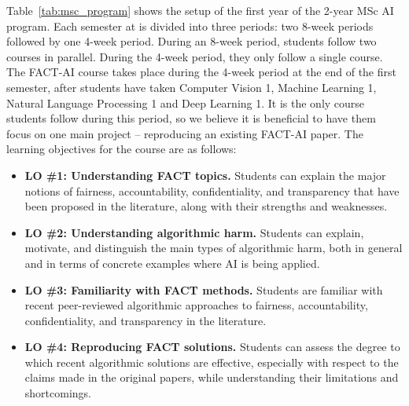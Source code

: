 Table~\ref{tab:msc_program} shows the setup of the first year of the 2-year MSc AI program. Each semester at \OurUniversity{} is divided into three periods: two 8-week periods followed by one 4-week period. During an 8-week period, students follow two courses in parallel. During the 4-week period, they only follow a single course. 
The FACT-AI course takes place during the 4-week period at the end of the first semester, after students have taken Computer Vision 1, Machine Learning 1, Natural Language Processing 1 and Deep Learning 1. 
It is the only course students follow during this period, so we believe it is beneficial to have them focus on one main project -- reproducing an existing FACT-AI paper. 
The learning objectives for the course are as follows: 

\begin{itemize}
	\item \textbf{LO \#1: Understanding FACT topics.} Students can explain the major notions of fairness, accountability, confidentiality, and transparency that have been proposed in the literature, along with their strengths and weaknesses.
	\item \textbf{LO \#2: Understanding algorithmic harm.} Students can explain, motivate, and distinguish the main types of algorithmic harm, both in general and in terms of concrete examples where AI is being applied.
	\item \textbf{LO \#3: Familiarity with FACT methods.} Students are familiar with recent peer-reviewed algorithmic approaches to fairness, accountability, confidentiality, and transparency in the literature. 
    \item \textbf{LO \#4: Reproducing FACT solutions.} Students can assess the degree to which recent algorithmic solutions are effective, especially with respect to the claims made in the original papers, while understanding their limitations and shortcomings. 
\end{itemize}
